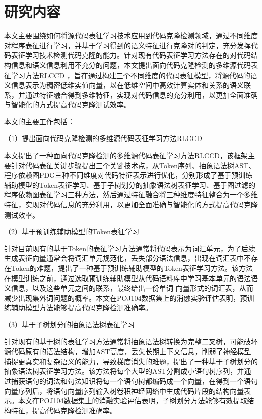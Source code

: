 \section{研究内容}
本文主要围绕如何将源代码表征学习技术应用到代码克隆检测领域，通过不同维度对程序表征进行学习，并基于学习得到的语义特征进行克隆对的判定，充分发挥代码表征学习技术检测代码克隆的能力。针对现有代码表征学习方法存在的对代码结构信息和语义信息利用不充分的问题，本文提出面向代码克隆检测的多维源代码表征学习方法RLCCD ，旨在通过构建三个不同维度的代码表征模型，将源代码的语义信息表示为稠密低维实值向量，以在低维空间中高效计算实体和关系的语义联系，并通过特征融合得到多维特征，实现对代码信息的充分利用，以更加全面准确与智能化的方式提高代码克隆测试效率。

本文的主要工作包括：

（1）提出面向代码克隆检测的多维源代码表征学习方法RLCCD 

本文提出了一种面向代码克隆检测的多维源代码表征学习方法RLCCD，该框架主要针对代码表征关键步骤提出三个关键技术点，从Token序列、抽象语法树AST、程序依赖图PDG三种不同维度对代码特征表示进行优化，分别形成了基于预训练辅助模型的Token表征学习、基于子树划分的抽象语法树表征学习、基于图过滤的程序依赖图表征学习三种方法，然后通过特征融合将三种维度特征整合为一个多维特征，实现对代码信息的充分利用，以更加全面准确与智能化的方式提高代码克隆测试效率。 

（2）基于预训练辅助模型的Token表征学习

针对目前现有的基于Token的表征学习方法通常将代码表示为词汇单元，为了后续生成表征向量通常会将词汇单元规范化，丢失部分语法信息，出现在词汇表中不存在Token的难题，提出了一种基于预训练辅助模型的Token表征学习方法。该方法在模型训练之前，通过选取预训练辅助模型从代码语料库中学习基本单元的语法语义信息，以及这些单元之间的联系，最终给出一份单词-向量形式的词汇表，从而减少出现集外词问题的概率。本文在POJ104数据集上的消融实验评估表明，预训练辅助模型方法能够提高代码克隆检测准确率。

（3）基于子树划分的抽象语法树表征学习

针对现有的基于树的表征学习方法通常将抽象语法树转换为完整二叉树，可能破坏源代码原有的语法结构，增加AST高度，丢失长期上下文信息，削弱了神经模型捕捉更真实和复杂语义的能力，导致梯度消失的难题，提出了一种基于子树划分的抽象语法树表征学习方法。该方法将每个大型的AST分割成小语句树序列，并通过捕获语句的词法和句法知识将每一个语句树都编码成一个向量，在得到一个语句向量序列后，将语句向量序列输入树卷积神经网络中生成代码片段的结构向量表示。本文在POJ104数据集上的消融实验评估表明，子树划分方法能够有效提取结构特征，提高代码克隆检测准确率。

